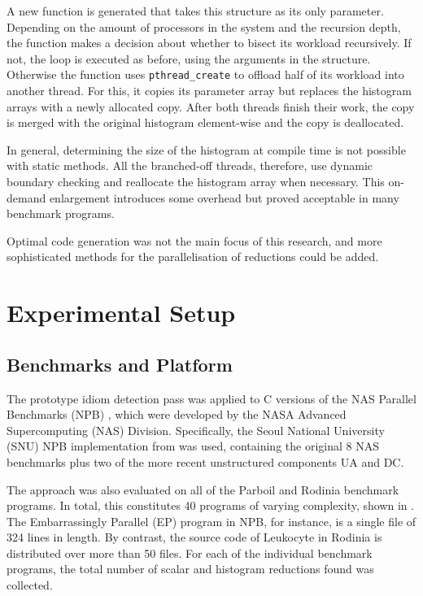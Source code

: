     A new function is generated that takes this structure as its only parameter.
    Depending on the amount of processors in the system and the recursion
    depth, the function makes a decision about whether to bisect its workload
    recursively.
    If not, the loop is executed as before, using the arguments in the
    structure.
    Otherwise the function uses \texttt{pthread\_create} to offload half of its
    workload into another thread.
    For this, it copies its parameter array but replaces the histogram arrays
    with a newly allocated copy.
    After both threads finish their work, the copy is merged with the original
    histogram element-wise and the copy is deallocated.

    In general, determining the size of the histogram at compile time is not
    possible with static methods.
    All the branched-off threads, therefore, use dynamic boundary checking and
    reallocate the histogram array when necessary.
    This on-demand enlargement introduces some overhead but proved acceptable in
    many benchmark programs.

    Optimal code generation was not the main focus of this research, and more
    sophisticated methods for the parallelisation of reductions could be added.

\section{Experimental Setup}

\subsection{Benchmarks and Platform}

    The prototype idiom detection pass was applied to C versions of the
    NAS Parallel Benchmarks (NPB) \citep{Bailey1991NPB}, which were developed
    by the NASA Advanced Supercomputing (NAS) Division.
    Specifically, the Seoul National University (SNU) NPB implementation from
    \citet{seo2011performance} was used, containing the original 8 NAS
    benchmarks plus two of the more recent unstructured components UA and DC.

    The approach was also evaluated on all of the Parboil \citep{Stratton2018}
    and Rodinia \citep{Che2009Rodinia} benchmark programs.
    In total, this constitutes 40 programs of varying complexity, shown in
    .
    The Embarrassingly Parallel (EP) program in NPB, for instance, is a single
    file of 324 lines in length.
    By contrast, the source code of Leukocyte in Rodinia is distributed over
    more than 50 files.
    For each of the individual benchmark programs, the total number of scalar
    and histogram reductions found was collected.

